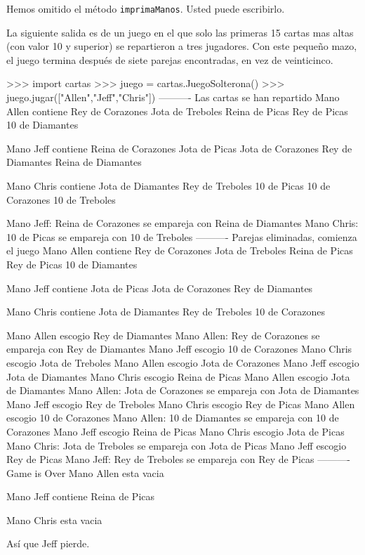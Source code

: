 Hemos omitido el método \texttt{imprimaManos}. Usted puede escribirlo.

La siguiente salida es de un juego en el que solo las primeras 15
cartas mas altas (con valor 10 y superior) se repartieron a tres jugadores.
Con este pequeño mazo, el juego termina después de siete parejas encontradas,
en vez de veinticinco.
\begin{pyconcode}
>>> import cartas
>>> juego = cartas.JuegoSolterona()
>>> juego.jugar(["Allen","Jeff","Chris"])
---------- Las cartas se han repartido
Mano Allen contiene
Rey de Corazones
 Jota de Treboles
  Reina de Picas
   Rey de Picas
    10 de Diamantes

Mano Jeff contiene
Reina de Corazones
 Jota de Picas
  Jota de Corazones
   Rey de Diamantes
    Reina de Diamantes

Mano Chris contiene
Jota de Diamantes
 Rey de Treboles
  10 de Picas
   10 de Corazones
    10 de Treboles

Mano Jeff: Reina de Corazones se empareja con Reina de 
Diamantes
Mano Chris: 10 de Picas se empareja con 10 de Treboles
----------  Parejas eliminadas, comienza el juego
Mano Allen contiene
Rey de Corazones
 Jota de Treboles
  Reina de Picas
   Rey de Picas
    10 de Diamantes

Mano Jeff contiene
Jota de Picas
 Jota de Corazones
  Rey de Diamantes

Mano Chris contiene
Jota de Diamantes
 Rey de Treboles
  10 de Corazones

Mano Allen escogio Rey de Diamantes
Mano Allen: Rey de Corazones se empareja con Rey de 
Diamantes
Mano Jeff escogio 10 de Corazones
Mano Chris escogio Jota de Treboles
Mano Allen escogio Jota de Corazones
Mano Jeff escogio Jota de Diamantes
Mano Chris escogio Reina de Picas
Mano Allen escogio Jota de Diamantes
Mano Allen: Jota de Corazones se empareja con Jota de 
Diamantes
Mano Jeff escogio Rey de Treboles
Mano Chris escogio Rey de Picas
Mano Allen escogio 10 de Corazones
Mano Allen: 10 de Diamantes se empareja con 10 de Corazones
Mano Jeff escogio Reina de Picas
Mano Chris escogio Jota de Picas
Mano Chris: Jota de Treboles se empareja con Jota de Picas
Mano Jeff escogio Rey de Picas
Mano Jeff: Rey de Treboles se empareja con Rey de Picas
---------- Game is Over
Mano Allen esta vacia

Mano Jeff contiene
Reina de Picas

Mano Chris esta vacia
\end{pyconcode}

Así que Jeff pierde.

